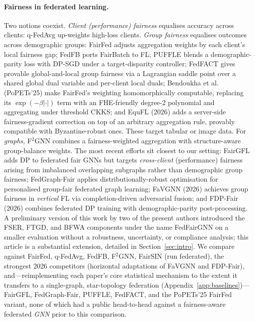 \documentclass[pdflatex,sn-mathphys-num]{sn-jnl}
\theoremstyle{thmstyleone}%
\theoremstyle{thmstyletwo}%
\theoremstyle{thmstylethree}%
\begin{document}
\paragraph{Fairness in federated learning.}
Two notions coexist. \emph{Client (performance) fairness} equalises accuracy
across clients: q-FedAvg \cite{li2020fair} up-weights high-loss clients.
\emph{Group fairness} equalises outcomes across demographic groups: FairFed
\cite{ezzeldin2023fairfed} adjusts aggregation weights by each client's local
fairness gap; FedFB ports FairBatch to FL; PUFFLE \cite{corbucci2024puffle}
blends a demographic-parity loss with DP-SGD under a target-disparity
controller; FedFACT \cite{fedfact2025} gives provable global-and-local group
fairness via a Lagrangian saddle point over a shared global dual variable and
per-client local duals; Bendoukha et al.\ \cite{bendoukha2025popets}
(PoPETs'25) make FairFed's weighting homomorphically computable, replacing its
$\exp(-\beta|\cdot|)$ term with an FHE-friendly degree-2 polynomial and
aggregating under threshold CKKS; and EquFL \cite{yu2026equfl} (2026) adds a
server-side fairness-gradient correction on top of an arbitrary aggregation
rule, provably compatible with Byzantine-robust ones. These target tabular or
image data. For
\emph{graphs}, F$^2$GNN \cite{f2gnn2023} combines a fairness-weighted
aggregation with structure-aware group-balance weights. The most recent
efforts sit closest to our setting: FairGFL \cite{fairgfl2026} adds DP to
federated fair GNNs but targets \emph{cross-client} (performance) fairness
arising from imbalanced overlapping subgraphs rather than demographic group
fairness; FedGraph-Fair \cite{fedgraphfair2026} applies distributionally-robust
optimisation for personalised group-fair federated graph learning; FaVGNN
\cite{wang2026favgnn} (2026) achieves group fairness in \emph{vertical} FL via
completion-driven adversarial fusion; and FDP-Fair \cite{xue2026fdpfair} (2026)
combines federated DP training with demographic-parity post-processing. A
preliminary version of this work by two of the present authors
\cite{dang2026fedfairgnn} introduced the FSER, FTGD, and BFWA components under
the name FedFairGNN on a smaller evaluation without a robustness, uncertainty,
or compliance analysis; this article is a
substantial
extension, detailed in Section~\ref{sec:intro}. We
compare against FairFed, q-FedAvg, FedFB, F$^2$GNN, FairSIN (run federated),
the strongest 2026 competitors (horizontal adaptations of FaVGNN and FDP-Fair),
and---reimplementing each paper's core statistical mechanism to the extent it
transfers to a single-graph, star-topology federation
(Appendix~\ref{app:baselines})---FairGFL, FedGraph-Fair, PUFFLE, FedFACT, and
the PoPETs'25 FairFed variant, none of which had a public head-to-head against
a fairness-aware federated \emph{GNN} prior to this comparison.
\end{document}
